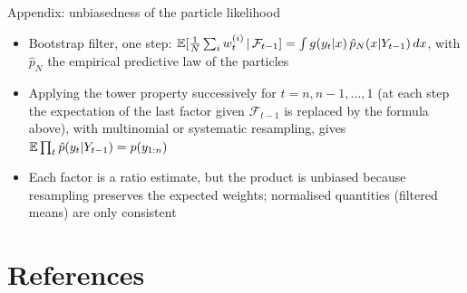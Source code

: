 \begin{frame}{Appendix: unbiasedness of the particle likelihood}
\hypertarget{atsapp3}{}
\itemsize{\small}
\begin{itemize}
    \item Bootstrap filter, one step: $\mathbb{E}[\frac1N\sum_iw^{(i)}_t\,|\,\mathcal F_{t-1}] = \int g(y_t | x)\,\hat p_{N}(x | Y_{t-1})\,dx$, with $\hat p_N$ the empirical predictive law of the particles
    \item Applying the tower property successively for $t = n, n-1, \dots, 1$ (at each step the expectation of the last factor given $\mathcal F_{t-1}$ is replaced by the formula above), with multinomial or systematic resampling, gives $\mathbb{E}\prod_t\hat p(y_t | Y_{t-1}) = p(y_{1:n})$ 
    \item Each factor is a ratio estimate, but the product is unbiased because resampling preserves the expected weights; normalised quantities (filtered means) are only consistent
\end{itemize}
\end{frame}


\section{References}

